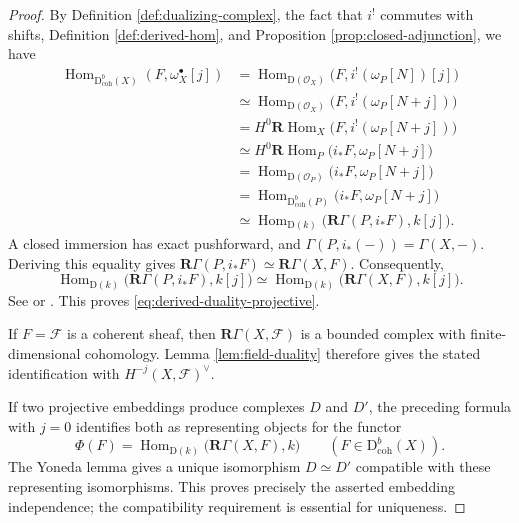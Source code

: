 \documentclass[11pt,a4paper]{article}
\theoremstyle{definition}
\theoremstyle{remark}
\newcommand{\OO}{\mathcal O}
\newcommand{\FF}{\mathcal F}
\newcommand{\Hom}{\operatorname{Hom}}
\newcommand{\RHom}{\mathbf R\!\operatorname{Hom}}
\newcommand{\RGamma}{\mathbf R\Gamma}
\newcommand{\D}{\mathrm D}
\newcommand{\Dbcoh}{\mathrm D^b_{\mathrm{coh}}}
\newcommand{\dual}{^{\vee}}
\begin{document}
\begin{proof}
By Definition \ref{def:dualizing-complex}, the fact that $i^!$ commutes with
shifts, Definition \ref{def:derived-hom}, and Proposition
\ref{prop:closed-adjunction}, we have
\begin{align*}
  \Hom_{\Dbcoh(X)}(F,\omega_X^\bullet[j])
  &=\Hom_{\D(\OO_X)}
      \bigl(F,i^!(\omega_P[N])[j]\bigr)\\
  &\simeq\Hom_{\D(\OO_X)}
      \bigl(F,i^!(\omega_P[N+j])\bigr)\\
  &=H^0\RHom_X\bigl(F,i^!(\omega_P[N+j])\bigr)\\
  &\simeq H^0\RHom_P\bigl(i_*F,\omega_P[N+j]\bigr)\\
  &=\Hom_{\D(\OO_P)}\bigl(i_*F,\omega_P[N+j]\bigr)\\
  &=\Hom_{\Dbcoh(P)}\bigl(i_*F,\omega_P[N+j]\bigr)\\
  &\simeq\Hom_{\D(k)}\bigl(\RGamma(P,i_*F),k[j]\bigr).
\end{align*}
A closed immersion has exact pushforward, and
$\Gamma(P,i_*(-))=\Gamma(X,-)$. Deriving this equality gives
$\RGamma(P,i_*F)\simeq\RGamma(X,F)$. Consequently,
\[
  \Hom_{\D(k)}\bigl(\RGamma(P,i_*F),k[j]\bigr)
  \simeq
  \Hom_{\D(k)}\bigl(\RGamma(X,F),k[j]\bigr).
\]
See
\cite[Chapter III, Exercise 4.1]{HartshorneAG} or
\cite[Tag 01XC]{Stacks}. This proves
\eqref{eq:derived-duality-projective}.

If $F=\FF$ is a coherent sheaf, then $\RGamma(X,\FF)$ is a bounded complex
with finite-dimensional cohomology. Lemma \ref{lem:field-duality} therefore
gives the stated identification with $H^{-j}(X,\FF)\dual$.

If two projective embeddings produce complexes $D$ and $D'$, the preceding
formula with $j=0$ identifies both as representing objects for the functor
\[
  \Phi(F)=\Hom_{\D(k)}\bigl(\RGamma(X,F),k\bigr)
  \qquad(F\in\Dbcoh(X)).
\]
The Yoneda lemma gives a unique isomorphism $D\simeq D'$ compatible with
these representing isomorphisms. This proves precisely the asserted
embedding independence; the compatibility requirement is essential for
uniqueness.
\end{proof}
\end{document}
